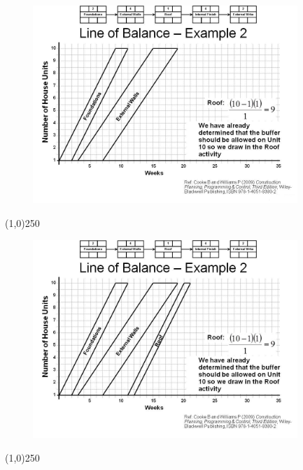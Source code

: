 \begin{frame}
\begin{figure}
	\centering
		\includegraphics[width = 10.0cm]{oldnotes/Slide262.jpg}
\end{figure}
\end{frame}
\begin{center}\line(1,0){250}\end{center}






\begin{frame}
\begin{figure}
	\centering
		\includegraphics[width = 10.0cm]{oldnotes/Slide263.jpg}
\end{figure}
\end{frame}
\begin{center}\line(1,0){250}\end{center}






